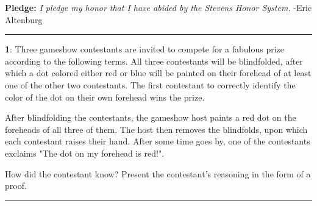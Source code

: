 \documentclass[11pt]{article}
\newcommand\question[2]{\vspace{.25in}\hrule\textbf{#1}: #2\vspace{.5em}\hrule\vspace{.10in}}
\begin{document}
\raggedright
\newcommand\NAME{Eric Altenburg}  %
\newcommand\COURSE{MA-240}
\newcommand\HWNUM{3 Corrections}              %


\textbf{Pledge:} \textit{I pledge my honor that I have abided by the Stevens Honor System.} -Eric Altenburg

\question{1}{Three gameshow contestants are invited to compete for a fabulous prize according to the following terms. All three contestants will be blindfolded, after which a dot colored either red or blue will be painted on their forehead of at least one of the other two contestants. The first contestant to correctly identify the color of the dot on their own forehead wins the prize. 

After blindfolding the contestants, the gameshow host paints a red dot on the foreheads of all three of them. The host then removes the blindfolds, upon which each contestant raises their hand. After some time goes by, one of the contestants exclaims "The dot on my forehead is red!".

How did the contestant know? Present the contestant's reasoning in the form of a proof.}
\end{document}
